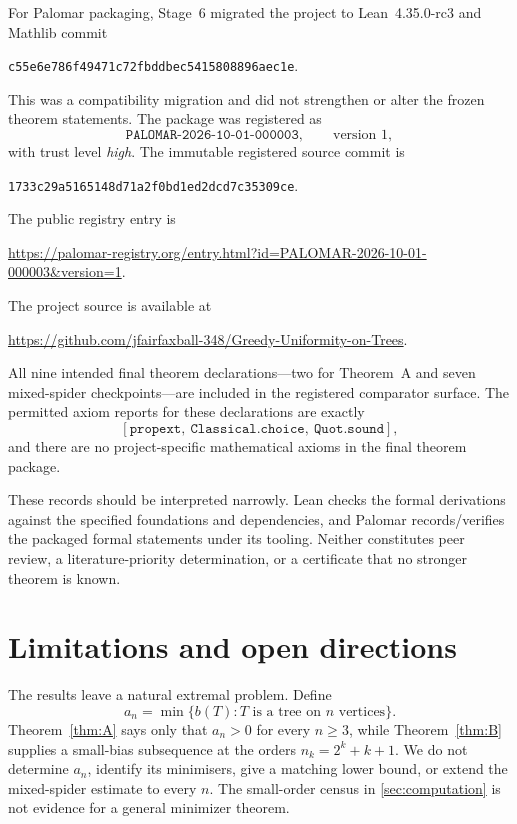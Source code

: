 \documentclass[11pt]{article}
\theoremstyle{definition}
\begin{document}
For Palomar packaging, Stage~6 migrated the project to Lean~4.35.0-rc3 and Mathlib commit
\begin{center}
\nolinkurl{c55e6e786f49471c72fbddbec5415808896aec1e}.
\end{center}
This was a compatibility migration and did not strengthen or alter the frozen theorem statements.  The package was registered as
\[
 \texttt{PALOMAR-2026-10-01-000003},\qquad \text{version }1,
\]
with trust level \emph{high}.  The immutable registered source commit is
\begin{center}
\nolinkurl{1733c29a5165148d71a2f0bd1ed2dcd7c35309ce}.
\end{center}
The public registry entry is
\begin{center}
\url{https://palomar-registry.org/entry.html?id=PALOMAR-2026-10-01-000003&version=1}.
\end{center}
The project source is available at\begin{center}
\url{https://github.com/jfairfaxball-348/Greedy-Uniformity-on-Trees}.
\end{center}
All nine intended final theorem declarations---two for Theorem~A and seven mixed-spider checkpoints---are included in the registered comparator surface.  The permitted axiom reports for these declarations are exactly
\[
 [\texttt{propext},\ \texttt{Classical.choice},\ \texttt{Quot.sound}],
\]
and there are no project-specific mathematical axioms in the final theorem package.

These records should be interpreted narrowly.  Lean checks the formal derivations against the specified foundations and dependencies, and Palomar records/verifies the packaged formal statements under its tooling.  Neither constitutes peer review, a literature-priority determination, or a certificate that no stronger theorem is known.

\section{Limitations and open directions}\label{sec:open}

The results leave a natural extremal problem.  Define
\[
 a_n=\min\{b(T): T\text{ is a tree on }n\text{ vertices}\}.
\]
Theorem~\ref{thm:A} says only that $a_n>0$ for every $n\ge3$, while Theorem~\ref{thm:B} supplies a small-bias subsequence at the orders $n_k=2^k+k+1$.  We do not determine $a_n$, identify its minimisers, give a matching lower bound, or extend the mixed-spider estimate to every $n$.  The small-order census in \cref{sec:computation} is not evidence for a general minimizer theorem.
\end{document}
